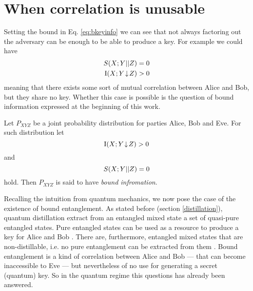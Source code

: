 \section{When correlation is unusable}
Setting the bound in Eq. \ref{eq:bkeyinfo} we can see that not always factoring out the adversary can be enough to be able to produce a key.
For example we could have 
\begin{align*}
	S(X;Y||Z) & = 0 \\
	\operatorname{I}(X;Y\!\downarrow\!Z) & > 0 
\end{align*}
meaning that there exists some sort of mutual correlation between Alice and Bob, but they share no key.
Whether this case is possible is the question of bound information expressed at the beginning of this work.
\begin{definition}\cite{GisWolf00, RW03} 
Let $P_{XYZ}$ be a joint probability distribution for parties Alice, Bob and Eve.
For such distribution let 
\begin{equation}
	\operatorname{I}(X;Y\!\downarrow\!Z) > 0
\end{equation}
and 
\begin{equation}
S(X;Y||Z) = 0
\end{equation}
hold.
Then $P_{XYZ}$ is said to have \emph{bound infromation}.
\end{definition}

Recalling the intuition from quantum mechanics, we now pose the case of the existence of bound entanglement.
As stated before (section \ref{distillation}), quantum distillation extract from an entangled mixed state a set of quasi-pure entangled states.
Pure entangled states can be used as a resource to produce a key for Alice and Bob \cite{Ekert91}.
There are, furthermore, entangled mixed states that are non-distillable, i.e. no pure entanglement can be extracted from them \cite{3H98}.
Bound entanglement is a kind of correlation between Alice and Bob --- that can become inaccessible to Eve --- but nevertheless of no use for generating a secret (quantum) key.
So in the quantum regime this questions has already been answered.

	
	
	
		
